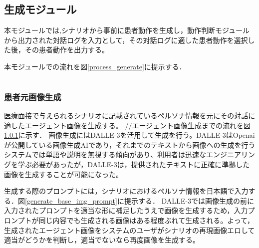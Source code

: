 \subsection{生成モジュール}\label{generate_module}
 本モジュールでは,シナリオから事前に患者動作を生成し，動作判断モジュールから出力された対話ログを入力として，その対話ログに適した患者動作を選択した後，その患者動作を出力する。
 \par
本モジュールでの流れを図\ref{process_generate}に提示する．

\section{}
\begin{figure}[p]
\end{figure}

\subsubsection{患者元画像生成}\label{generate_base_img}
医療面接で与えられるシナリオに記載されているペルソナ情報を元にその対話に適したエージェント画像を生成する。
//エージェント画像生成までの流れを図\ref{generate_base_img}に示す．
画像生成にはDALLE-3を活用して生成を行う。DALLE-3はOpenaiが公開している画像生成AIであり，それまでのテキストから画像への生成を行うシステムでは単語や説明を無視する傾向があり、利用者は迅速なエンジニアリングを学ぶ必要があったが，DALLE-3は，提供されたテキストに正確に準拠した画像を生成することが可能になった。
\par
生成する際のプロンプトには，シナリオにおけるペルソナ情報を日本語で入力する．図\ref{generate_base_img_prompt}に提示する．
DALLE-3では画像生成の前に入力されたプロンプトを適当な形に補足したうえで画像を生成するため，入力プロンプトが同じ内容でも生成される画像はある程度ぶれて生成される。よって，生成されたエージェント画像をシステムのユーザがシナリオの再現画像エロして適当がどうかを判断し，適当でないなら再度画像を生成する。

